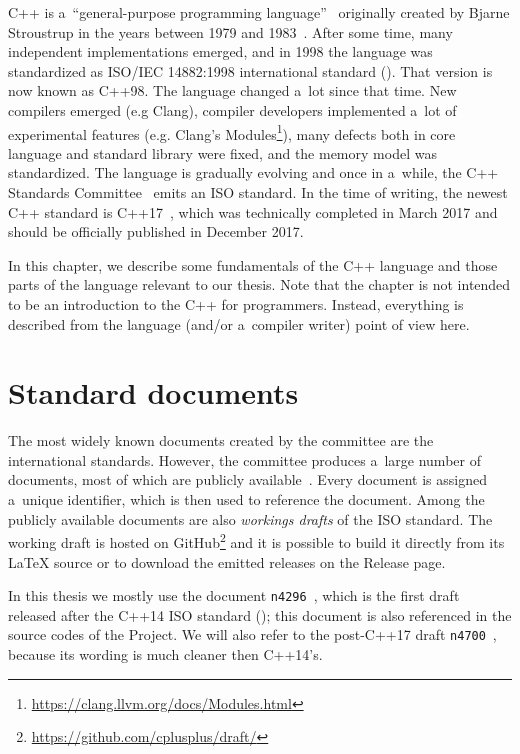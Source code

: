 \documentclass[nolot,nolof,nocover,printed]{fithesis3}
\newcommand{\Project}{Project\xspace}
\begin{document}
C++ is a~\enquote{general-purpose programming language}~\cite{bjarne-cpp} originally created by Bjarne Stroustrup in the years between 1979 and 1983~\cite{bjarne-faq}. After some time, many independent implementations emerged, and in 1998 the language was standardized as ISO/IEC 14882:1998 international standard (\cite{ISOcpp98}). That version is now known as C++98. The language changed a~lot since that time. New compilers emerged (e.g Clang), compiler developers implemented a~lot of experimental features (e.g. Clang's Modules\footnote{\url{https://clang.llvm.org/docs/Modules.html}}), many defects both in core language and standard library were fixed, and the memory model was standardized. The language is gradually evolving and once in a~while, the C++ Standards Committee~\cite{wg21home} emits an ISO standard. In the time of writing, the newest C++ standard is C++17~\cite{ISOcpp17}, which was technically completed in March 2017 and should be officially published in December 2017.

In this chapter, we describe some fundamentals of the C++ language and those parts of the language relevant to our thesis. Note that the chapter is not intended to be an introduction to the C++ for programmers. Instead, everything is described from the language (and/or a~compiler writer) point of view here.

\section{Standard documents}
The most widely known documents created by the committee are the international standards. However, the committee produces a~large number of documents, most of which are publicly available~\cite{wg21papers}. Every document is assigned a~unique identifier, which is then used to reference the document. Among the publicly available documents are also \textit{workings drafts} of the ISO standard. The working draft is hosted on GitHub\footnote{\url{https://github.com/cplusplus/draft/}} and it is possible to build it directly from its \LaTeX{ }source or to download the emitted releases on the Release page.

In this thesis we mostly use the document \texttt{n4296}~\cite{n4296}, which is the first draft released after the C++14 ISO standard (\cite{ISOcpp14}); this document is also referenced in the source codes of the \Project. We will also refer to the post-C++17 draft \texttt{n4700}~\cite{n4296}, because its wording is much cleaner then C++14's.
\end{document}
